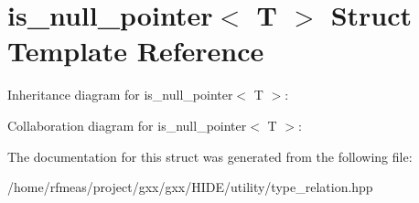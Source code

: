 \hypertarget{structis__null__pointer}{}\section{is\+\_\+null\+\_\+pointer$<$ T $>$ Struct Template Reference}
\label{structis__null__pointer}


Inheritance diagram for is\+\_\+null\+\_\+pointer$<$ T $>$\+:


Collaboration diagram for is\+\_\+null\+\_\+pointer$<$ T $>$\+:


The documentation for this struct was generated from the following file\+:\begin{DoxyCompactItemize}
\item 
/home/rfmeas/project/gxx/gxx/\+H\+I\+D\+E/utility/type\+\_\+relation.\+hpp\end{DoxyCompactItemize}
